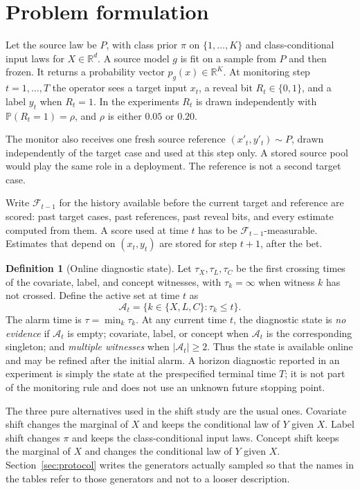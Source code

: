 \documentclass[11pt,a4paper]{article}
\theoremstyle{definition}
\newtheorem{definition}{Definition}
\newcommand{\R}{\mathbb{R}}
\newcommand{\Prob}{\mathbb{P}}
\newcommand{\cF}{\mathcal{F}}
\newcommand{\1}{\mathbf{1}}
\begin{document}
\section{Problem formulation}
\label{sec:problem}

Let the source law be \(P\), with class prior \(\pi\) on \(\{1,\ldots,K\}\) and class-conditional input laws for \(X\in\R^d\). A source model \(g\) is fit on a sample from \(P\) and then frozen. It returns a probability vector \(p_g(x)\in\R^K\). At monitoring step \(t=1,\ldots,T\) the operator sees a target input \(x_t\), a reveal bit \(R_t\in\{0,1\}\), and a label \(y_t\) when \(R_t=1\). In the experiments \(R_t\) is drawn independently with \(\Prob(R_t=1)=\rho\), and \(\rho\) is either \(0.05\) or \(0.20\).

The monitor also receives one fresh source reference \((x'_t,y'_t)\sim P\), drawn independently of the target case and used at this step only. A stored source pool would play the same role in a deployment. The reference is not a second target case.

Write \(\cF_{t-1}\) for the history available before the current target and reference are scored: past target cases, past references, past reveal bits, and every estimate computed from them. A score used at time \(t\) has to be \(\cF_{t-1}\)-measurable. Estimates that depend on \((x_t,y_t)\) are stored for step \(t+1\), after the bet.

\begin{definition}[Online diagnostic state]
\label{def:names}
Let $\tau_X,\tau_L,\tau_C$ be the first crossing times of the covariate, label, and concept witnesses, with $\tau_k=\infty$ when witness $k$ has not crossed. Define the active set at time $t$ as
\[
\mathcal{A}_t=\{k\in\{X,L,C\}:\tau_k\le t\}.
\]
The alarm time is $\tau=\min_k\tau_k$. At any current time $t$, the diagnostic state is \emph{no evidence} if $\mathcal{A}_t$ is empty; covariate, label, or concept when $\mathcal{A}_t$ is the corresponding singleton; and \emph{multiple witnesses} when $|\mathcal{A}_t|\ge2$. Thus the state is available online and may be refined after the initial alarm. A horizon diagnostic reported in an experiment is simply the state at the prespecified terminal time $T$; it is not part of the monitoring rule and does not use an unknown future stopping point.
\end{definition}

The three pure alternatives used in the shift study are the usual ones. Covariate shift changes the marginal of \(X\) and keeps the conditional law of \(Y\) given \(X\). Label shift changes \(\pi\) and keeps the class-conditional input laws. Concept shift keeps the marginal of \(X\) and changes the conditional law of \(Y\) given \(X\). Section~\ref{sec:protocol} writes the generators actually sampled so that the names in the tables refer to those generators and not to a looser description.
\end{document}
